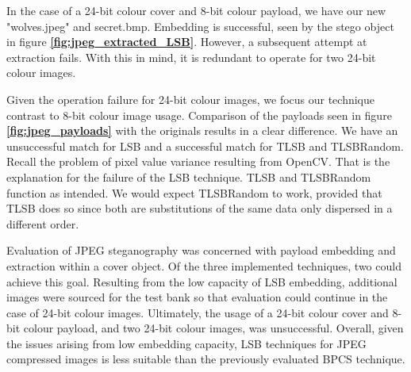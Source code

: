 \documentclass{l4proj}
\begin{document}
In the case of a 24-bit colour cover and 8-bit colour payload, we have our new "wolves.jpeg" and secret.bmp. Embedding is successful, seen by the stego object in figure \textbf{\ref{fig:jpeg_extracted_LSB}}. However, a subsequent attempt at extraction fails. With this in mind, it is redundant to operate for two 24-bit colour images.

Given the operation failure for 24-bit colour images, we focus our technique contrast to 8-bit colour image usage. Comparison of the payloads seen in figure \textbf{\ref{fig:jpeg_payloads}} with the originals results in a clear difference. We have an unsuccessful match for LSB and a successful match for TLSB and TLSBRandom.  Recall the problem of pixel value variance resulting from OpenCV. That is the explanation for the failure of the LSB technique. TLSB and TLSBRandom function as intended.   We would expect TLSBRandom to work, provided that TLSB does so since both are substitutions of the same data only dispersed in a different order.

Evaluation of JPEG steganography was concerned with payload embedding and extraction within a cover object. Of the three implemented techniques, two could achieve this goal. Resulting from the low capacity of LSB embedding, additional images were sourced for the test bank so that evaluation could continue in the case of 24-bit colour images. Ultimately, the usage of a 24-bit colour cover and 8-bit colour payload, and two 24-bit colour images, was unsuccessful. Overall, given the issues arising from low embedding capacity, LSB techniques for JPEG compressed images is less suitable than the previously evaluated BPCS technique.
\end{document}

